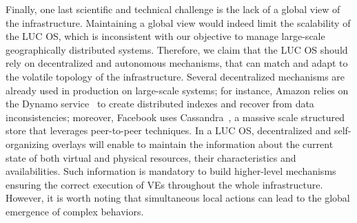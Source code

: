 Finally, one last scientific and technical challenge is the lack of a global view
of the infrastructure.
Maintaining a global view would indeed limit the scalability of the LUC OS, which is
inconsistent with our objective to manage large-scale geographically distributed 
systems.
Therefore, we claim that the LUC OS should rely on decentralized and autonomous mechanisms,
that can match and adapt to the volatile topology of the infrastructure.
Several decentralized mechanisms are already used in production on large-scale systems;
for instance, Amazon relies on the Dynamo service~\cite{decandia:2007} to create
distributed indexes and recover from data inconsistencies; moreover, Facebook uses
Cassandra~\cite{lakshman:2010}, a massive scale structured store that leverages peer-to-peer techniques.
%
%
In a LUC OS, decentralized and self-organizing overlays will enable to maintain
the information about
the current state of both virtual and physical resources, their characteristics and
availabilities. Such information is mandatory to build higher-level mechanisms ensuring the correct execution of VEs throughout 
the whole infrastructure. 
However, it is worth noting that simultaneous local actions can lead to the global emergence of complex
behaviors.


